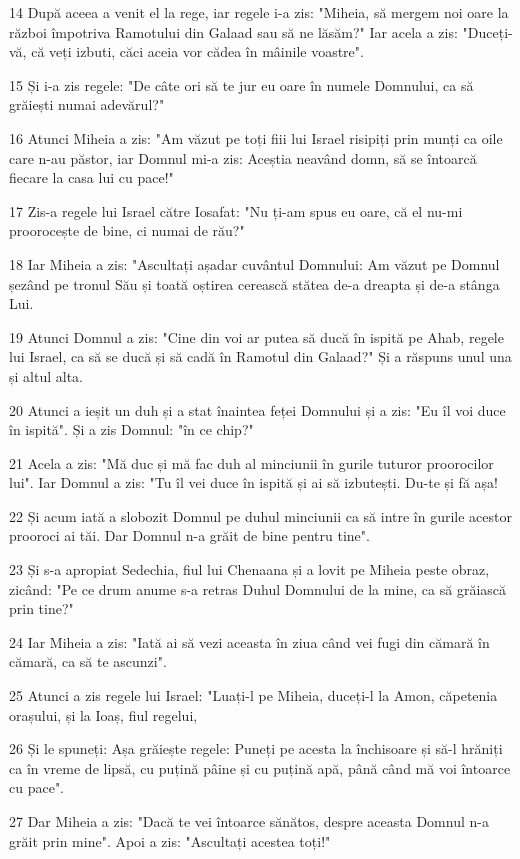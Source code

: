 \par 14 După aceea a venit el la rege, iar regele i-a zis: "Miheia, să mergem noi oare la război împotriva Ramotului din Galaad sau să ne lăsăm?" Iar acela a zis: "Duceți-vă, că veți izbuti, căci aceia vor cădea în mâinile voastre".
\par 15 Și i-a zis regele: "De câte ori să te jur eu oare în numele Domnului, ca să grăiești numai adevărul?"
\par 16 Atunci Miheia a zis: "Am văzut pe toți fiii lui Israel risipiți prin munți ca oile care n-au păstor, iar Domnul mi-a zis: Aceștia neavând domn, să se întoarcă fiecare la casa lui cu pace!"
\par 17 Zis-a regele lui Israel către Iosafat: "Nu ți-am spus eu oare, că el nu-mi proorocește de bine, ci numai de rău?"
\par 18 Iar Miheia a zis: "Ascultați așadar cuvântul Domnului: Am văzut pe Domnul șezând pe tronul Său și toată oștirea cerească stătea de-a dreapta și de-a stânga Lui.
\par 19 Atunci Domnul a zis: "Cine din voi ar putea să ducă în ispită pe Ahab, regele lui Israel, ca să se ducă și să cadă în Ramotul din Galaad?" Și a răspuns unul una și altul alta.
\par 20 Atunci a ieșit un duh și a stat înaintea feței Domnului și a zis: "Eu îl voi duce în ispită". Și a zis Domnul: "în ce chip?"
\par 21 Acela a zis: "Mă duc și mă fac duh al minciunii în gurile tuturor proorocilor lui". Iar Domnul a zis: "Tu îl vei duce în ispită și ai să izbutești. Du-te și fă așa!
\par 22 Și acum iată a slobozit Domnul pe duhul minciunii ca să intre în gurile acestor prooroci ai tăi. Dar Domnul n-a grăit de bine pentru tine".
\par 23 Și s-a apropiat Sedechia, fiul lui Chenaana și a lovit pe Miheia peste obraz, zicând: "Pe ce drum anume s-a retras Duhul Domnului de la mine, ca să grăiască prin tine?"
\par 24 Iar Miheia a zis: "Iată ai să vezi aceasta în ziua când vei fugi din cămară în cămară, ca să te ascunzi".
\par 25 Atunci a zis regele lui Israel: "Luați-l pe Miheia, duceți-l la Amon, căpetenia orașului, și la Ioaș, fiul regelui,
\par 26 Și le spuneți: Așa grăiește regele: Puneți pe acesta la închisoare și să-l hrăniți ca în vreme de lipsă, cu puțină pâine și cu puțină apă, până când mă voi întoarce cu pace".
\par 27 Dar Miheia a zis: "Dacă te vei întoarce sănătos, despre aceasta Domnul n-a grăit prin mine". Apoi a zis: "Ascultați acestea toți!"
